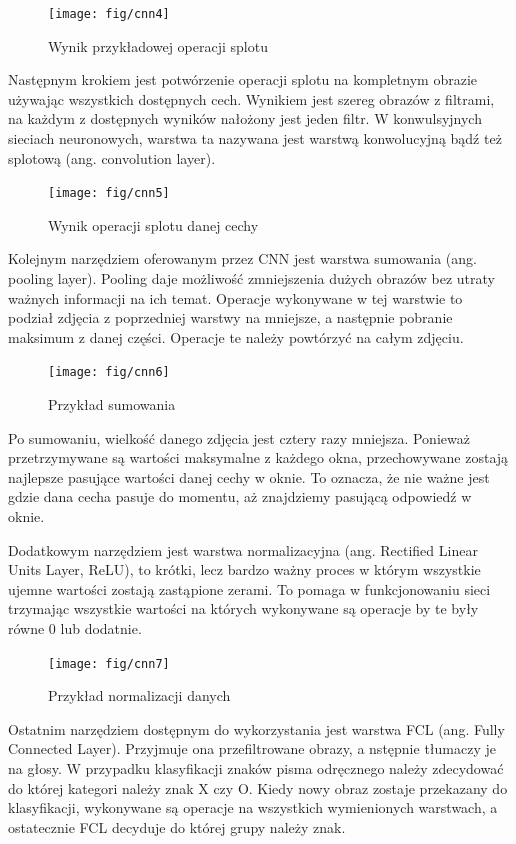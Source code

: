 \documentclass[brudnopis]{xmgr}
\begin{document}
\begin{figure}[!tbh]
\centering
\texttt{[image: fig/cnn4]}
\caption{Wynik przykładowej operacji splotu}
\end{figure}
\newpage

Następnym krokiem jest potwórzenie operacji splotu na kompletnym obrazie używając wszystkich dostępnych cech. Wynikiem jest szereg obrazów z filtrami, na każdym z dostępnych wyników nałożony jest jeden filtr. W konwulsyjnych sieciach neuronowych, warstwa ta nazywana jest warstwą konwolucyjną bądź też splotową (ang. convolution layer).

\begin{figure}[!tbh]
\centering
\texttt{[image: fig/cnn5]}
\caption{Wynik operacji splotu danej cechy}
\end{figure}
\newpage

Kolejnym narzędziem oferowanym przez CNN jest warstwa sumowania (ang. pooling layer). Pooling daje możliwość zmniejszenia dużych obrazów bez utraty ważnych informacji na ich temat. Operacje wykonywane w tej warstwie to podział zdjęcia z poprzedniej warstwy na mniejsze, a następnie pobranie maksimum z danej części. Operacje te należy powtórzyć na całym zdjęciu.


\begin{figure}[!tbh]
\centering
\texttt{[image: fig/cnn6]}
\caption{Przykład sumowania}
\end{figure}

Po sumowaniu, wielkość danego zdjęcia jest cztery razy mniejsza. Ponieważ przetrzymywane są wartości maksymalne z każdego okna, przechowywane zostają najlepsze pasujące wartości danej cechy w oknie. To oznacza, że nie ważne jest gdzie dana cecha pasuje do momentu, aż znajdziemy pasującą odpowiedź w oknie.

Dodatkowym narzędziem jest warstwa normalizacyjna (ang. Rectified Linear Units Layer, ReLU), to krótki, lecz bardzo ważny proces w którym wszystkie ujemne wartości zostają zastąpione zerami. To pomaga w funkcjonowaniu sieci trzymając wszystkie wartości na których wykonywane są operacje by te były równe 0 lub dodatnie.

\begin{figure}[!tbh]
\centering
\texttt{[image: fig/cnn7]}
\caption{Przykład normalizacji danych}
\end{figure}
\newpage

Ostatnim narzędziem dostępnym do wykorzystania jest warstwa FCL (ang. Fully Connected Layer). Przyjmuje ona przefiltrowane obrazy, a nstępnie tłumaczy je na głosy. W przypadku klasyfikacji znaków pisma odręcznego należy zdecydować do której kategori należy znak X czy O. Kiedy nowy obraz zostaje przekazany do klasyfikacji, wykonywane są operacje na wszystkich wymienionych warstwach, a ostatecznie FCL decyduje do której grupy należy znak.
\end{document}
